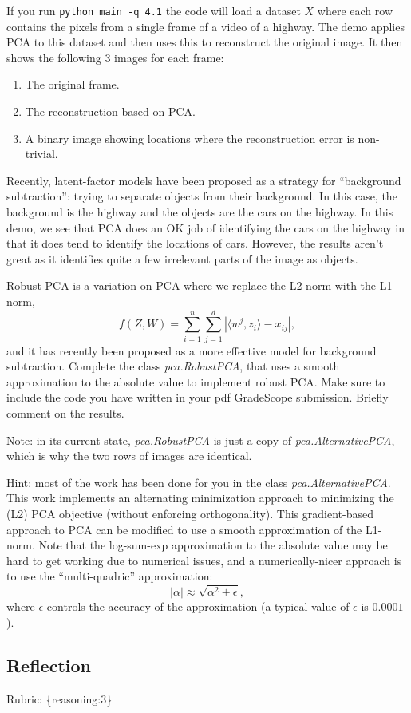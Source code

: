 \documentclass{article}
\def\rubric#1{\gre{Rubric: \{#1\}}}{}
\def\blu#1{{\color{blu}#1}}
\def\gre#1{{\color{gre}#1}}
\def\enum#1{\begin{enumerate}#1\end{enumerate}}
\begin{document}
If you run \verb|python main -q 4.1| the code will load a dataset $X$ where each row contains the pixels from a single frame of a video of a highway. The demo applies PCA to this dataset and then uses this to reconstruct the original image.
It then shows the following 3 images for each frame:
\enum{
\item The original frame.
\item The reconstruction based on PCA.
\item A binary image showing locations where the reconstruction error is non-trivial.
}
Recently, latent-factor models have been proposed as a strategy for ``background subtraction'': trying to separate objects from their background. In this case, the background is the highway and the objects are the cars on the highway. In this demo, we see that PCA does an OK job of identifying the cars on the highway in that it does tend to identify the locations of cars. However, the results aren't great as it identifies quite a few irrelevant parts of the image as objects.

Robust PCA is a variation on PCA where we replace the L2-norm with the L1-norm,
\[
f(Z,W) = \sum_{i=1}^n\sum_{j=1}^d |\langle w^j, z_i\rangle - x_{ij}|,
\]
and it has recently been proposed as a more effective model for background subtraction. \blu{Complete the class \emph{pca.RobustPCA},
that uses a smooth approximation to the absolute value to implement robust PCA. Make sure to include the code you have written in your pdf GradeScope submission. Briefly comment on the results.} 

Note: in its current state, \emph{pca.RobustPCA} is just a copy of \emph{pca.AlternativePCA}, which is why the two rows of images are identical.

Hint: most of the work has been done for you in the class \emph{pca.AlternativePCA}.
This work implements an alternating minimization approach to minimizing the (L2) PCA objective (without enforcing orthogonality). This gradient-based approach to PCA can be modified to use a smooth approximation of the L1-norm. Note that the log-sum-exp approximation to the absolute value may be hard to get working due to numerical issues, and a numerically-nicer approach is to use the ``multi-quadric'' approximation:
\[
|\alpha| \approx \sqrt{\alpha^2 + \epsilon},
\]
where $\epsilon$ controls the accuracy of the approximation (a typical value of $\epsilon$ is $0.0001$).



\subsection{Reflection}
\rubric{reasoning:3}
\end{document}
